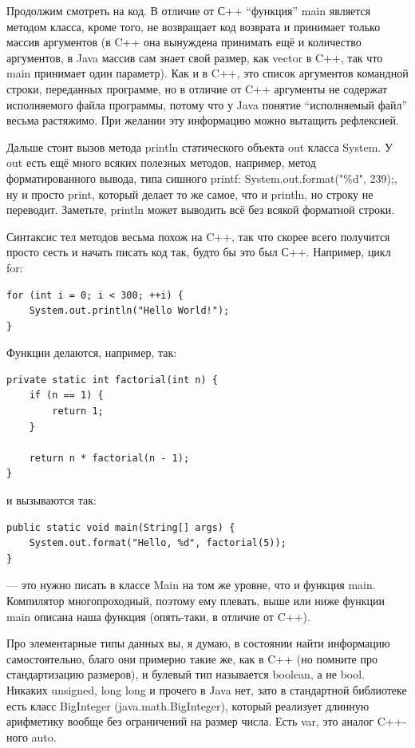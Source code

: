 \documentclass[a5paper]{article}
\begin{document}
Продолжим смотреть на код. В отличие от С++ ``функция'' main является методом класса, кроме того, не возвращает код возврата и принимает только массив аргументов (в C++ она вынуждена принимать ещё и количество аргументов, в Java массив сам знает свой размер, как vector в C++, так что main принимает один параметр). Как и в C++, это список аргументов командной строки, переданных программе, но в отличие от C++ аргументы не содержат исполняемого файла программы, потому что у Java понятие ``исполняемый файл'' весьма растяжимо. При желании эту информацию можно вытащить рефлексией.

Дальше стоит вызов метода println статического объекта out класса System. У out есть ещё много всяких полезных методов, например, метод форматированного вывода, типа сишного printf: System.out.format("\%d", 239);, ну и просто print, который делает то же самое, что и println, но строку не переводит. Заметьте, println может выводить всё без всякой форматной строки.

Синтаксис тел методов весьма похож на C++, так что скорее всего получится просто сесть и начать писать код так, будто бы это был С++. Например, цикл for:

\begin{verbatim}
for (int i = 0; i < 300; ++i) {
    System.out.println("Hello World!");
}
\end{verbatim}

Функции делаются, например, так:

\begin{verbatim}
private static int factorial(int n) {
    if (n == 1) {
        return 1;
    }

    return n * factorial(n - 1);
}
\end{verbatim}

и вызываются так:

\begin{verbatim}
public static void main(String[] args) {
    System.out.format("Hello, %d", factorial(5));
}
\end{verbatim}

--- это нужно писать в классе Main на том же уровне, что и функция main. Компилятор многопроходный, поэтому ему плевать, выше или ниже функции main описана наша функция (опять-таки, в отличие от C++).

Про элементарные типы данных вы, я думаю, в состоянии найти информацию самостоятельно, благо они примерно такие же, как в C++ (но помните про стандартизацию размеров), и булевый тип называется boolean, а не bool. Никаких unsigned, long long и прочего в Java нет, зато в стандартной библиотеке есть класс BigInteger (java.math.BigInteger), который реализует длинную арифметику вообще без ограничений на размер числа. Есть var, это аналог C++-ного auto.
\end{document}
